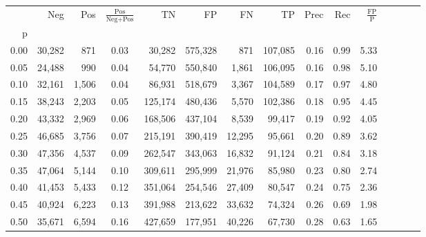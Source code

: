 \begin{tabular}{rrrcrrrrrrrrrrr}
\toprule
{} &     Neg &    Pos & $\frac{\text{Pos}}{\text{Neg}+\text{Pos}}$ &       TN &       FP &       FN &       TP &  Prec &   Rec & $\frac{\text{FP}}{\text{P}}$ \\
p    &         &        &                                            &          &          &          &          &       &       &                              \\
\midrule
0.00 &  30,282 &    871 &                                       0.03 &   30,282 &  575,328 &      871 &  107,085 &  0.16 &  0.99 &                         5.33 \\
0.05 &  24,488 &    990 &                                       0.04 &   54,770 &  550,840 &    1,861 &  106,095 &  0.16 &  0.98 &                         5.10 \\
0.10 &  32,161 &  1,506 &                                       0.04 &   86,931 &  518,679 &    3,367 &  104,589 &  0.17 &  0.97 &                         4.80 \\
0.15 &  38,243 &  2,203 &                                       0.05 &  125,174 &  480,436 &    5,570 &  102,386 &  0.18 &  0.95 &                         4.45 \\
0.20 &  43,332 &  2,969 &                                       0.06 &  168,506 &  437,104 &    8,539 &   99,417 &  0.19 &  0.92 &                         4.05 \\
0.25 &  46,685 &  3,756 &                                       0.07 &  215,191 &  390,419 &   12,295 &   95,661 &  0.20 &  0.89 &                         3.62 \\
0.30 &  47,356 &  4,537 &                                       0.09 &  262,547 &  343,063 &   16,832 &   91,124 &  0.21 &  0.84 &                         3.18 \\
0.35 &  47,064 &  5,144 &                                       0.10 &  309,611 &  295,999 &   21,976 &   85,980 &  0.23 &  0.80 &                         2.74 \\
0.40 &  41,453 &  5,433 &                                       0.12 &  351,064 &  254,546 &   27,409 &   80,547 &  0.24 &  0.75 &                         2.36 \\
0.45 &  40,924 &  6,223 &                                       0.13 &  391,988 &  213,622 &   33,632 &   74,324 &  0.26 &  0.69 &                         1.98 \\
0.50 &  35,671 &  6,594 &                                       0.16 &  427,659 &  177,951 &   40,226 &   67,730 &  0.28 &  0.63 &                         1.65 \\

\end{tabular}
